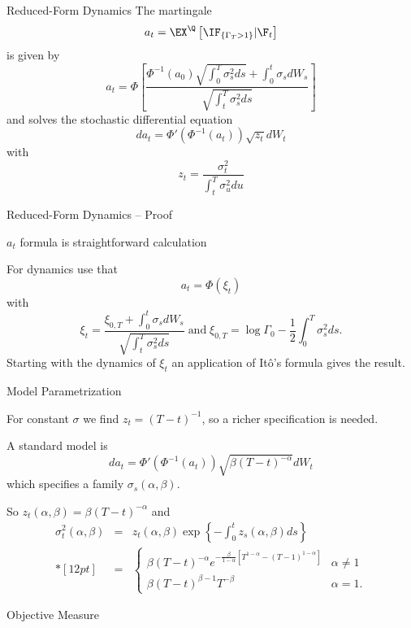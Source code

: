 
{Reduced-Form Dynamics}
The martingale
$$
a_t = \EX^\Q\left[\IF_{\{\Gamma_T>1\}} |\F_t\right]
$$
is given by
$$
a_t= \Phi \left[\frac{\Phi^{-1}(a_0) \sqrt{\int_0^T \sigma^2_s ds}+\int_0^t \sigma_s dW_s}{\sqrt{\int_t^T \sigma^2_s ds}}\right]
$$
and solves the stochastic differential equation
$$
da_t = \Phi'\left(\Phi^{-1}(a_t)\right)\sqrt{z_t}dW_t
$$
with
$$
z_t=\frac{\sigma_t^2}{\int_t^T \sigma^2_u du}
$$

{Reduced-Form Dynamics -- Proof}


	$a_t$ formula is straightforward calculation

	For dynamics use that
$$
a_t = \Phi(\xi_t)
$$
with
$$
\xi_t = \frac{\xi_{0,T}+\int_0^t\sigma_s dW_s}{\sqrt{\int_t^T\sigma_s^2ds}}\; \mbox{and}\;  \xi_{0,T}=\log \Gamma_0 - \frac{1}{2} \int_0^T\sigma_s^2ds.
$$
Starting with the dynamics of $\xi_t$ an application of It{\^o}'s formula gives the result.



{Model Parametrization}


	For constant $\sigma$ we find $z_t=(T-t)^{-1}$, so a richer specification is needed.

	A standard model is
$$
da_t = \Phi'\left(\Phi^{-1}(a_t)\right)\sqrt{\beta(T-t)^{-\alpha}}dW_t
$$
which specifies a family $\sigma_s(\alpha,\beta)$.

So $z_t(\alpha, \beta) = \beta(T-t)^{-\alpha}$ and
$$
\begin{array}{lll}
\sigma_t^2(\alpha,\beta)&=& \displaystyle z_t(\alpha, \beta) \exp\left\{-\int_0^t z_s(\alpha, \beta) ds \right\}\\*[12pt]
&=&\displaystyle
\left\{
\begin{array}{ll}
\beta(T-t)^{-\alpha} e^{-\frac{\beta}{1-\alpha}[T^{1-\alpha}-(T-1)^{1-\alpha}]} &\alpha \not=1\\
\beta(T-t)^{\beta-1}T^{-\beta} &\alpha=1.
\end{array}
\right.
\end{array}
$$


{Objective Measure}


